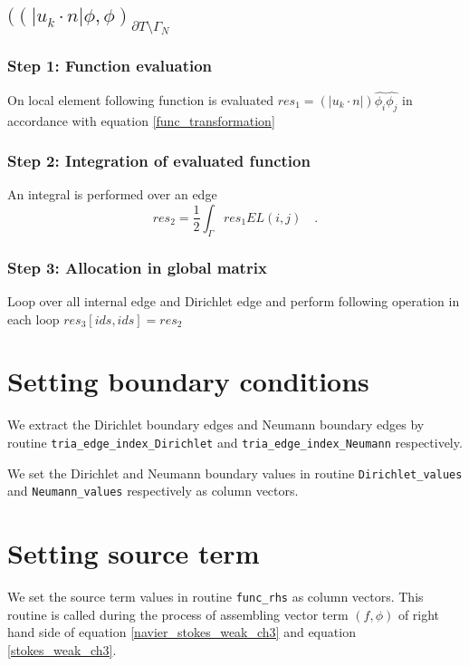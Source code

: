 \documentclass[a4paper]{book}
\begin{document}
\subsection{$((|u_k \cdot n| \phi,\phi)_{\partial T \setminus \Gamma_N}$}

\subsubsection{Step 1: Function evaluation}

On local element following function is evaluated $res_1 = (|u_k \cdot n|) \hat{\phi_i} \hat{\phi_j} $ in accordance with equation \ref{func_transformation}\\
\subsubsection{Step 2: Integration of evaluated function}

An integral is performed over an edge
\begin{equation}
res_2 = \frac{1}{2} \int_{\Gamma} res_1 EL(i,j) \quad \textrm{.}
\end{equation}

\subsubsection{Step 3: Allocation in global matrix}

Loop over all internal edge and Dirichlet edge and perform following operation in each loop $res_3[ids,ids] = res_2$\\

\section{Setting boundary conditions}

We extract the Dirichlet boundary edges and Neumann boundary edges by routine \verb|tria_edge_index_Dirichlet| and \verb|tria_edge_index_Neumann| respectively.

We set the Dirichlet and Neumann boundary values in routine \verb|Dirichlet_values| and \verb|Neumann_values| respectively as column vectors. 

\section{Setting source term}

We set the source term values in routine \verb|func_rhs| as column vectors. This routine is called during the process of assembling vector term $(f,\phi)$ of right hand side of equation \ref{navier_stokes_weak_ch3} and equation \ref{stokes_weak_ch3}.
\end{document}
